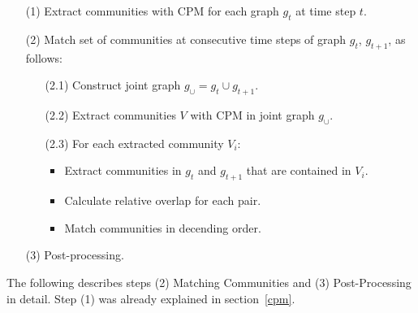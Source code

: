\documentclass[runningheads,a4paper]{llncs}
\begin{document}
\medskip

\noindent
\colorbox{usethiscolorhere}{
\begin{minipage}{\dimexpr\textwidth-2\fboxsep}

\begin{enumerate}
\small
\item[(1)] Extract communities with CPM for each graph $g_t$ at time step $t$.
\item[(2)] Match set of communities at consecutive time steps of graph $g_t$, $g_{t+1}$, as follows:
	\begin{enumerate}
		\item[(2.1)] Construct joint graph $g_{\cup}=g_t \cup g_{t+1}$.
		\item[(2.2)] Extract communities $V$ with CPM in joint graph $g_{\cup}$.
		\item[(2.3)] For each extracted community $V_i$: 
		\begin{itemize}
			\item Extract communities in $g_t$ and $g_{t+1}$ that are contained in $V_i$.
			\item Calculate relative overlap for each pair.
			\item Match communities in decending order.
		\end{itemize}
	\end{enumerate}
\item[(3)] Post-processing.
\end{enumerate}

\end{minipage}
}

\medskip

The following describes steps (2) Matching Communities and (3) Post-Processing in detail.
Step (1) was already explained in section~\ref{cpm}.
\end{document}
